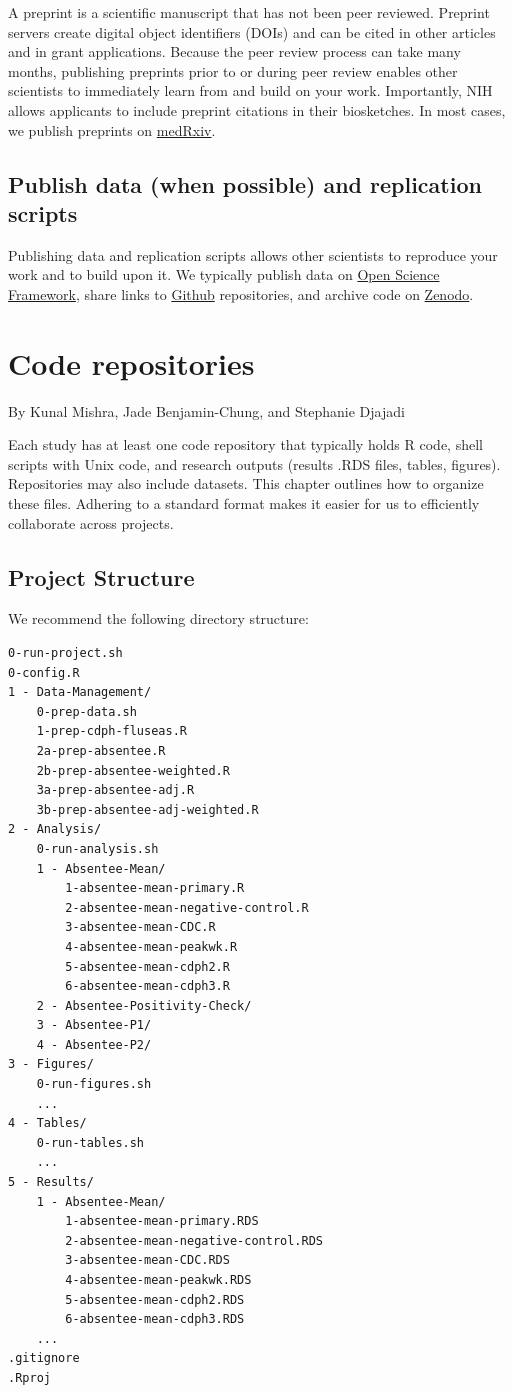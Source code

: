 \documentclass[
]{book}
\begin{document}
A preprint is a scientific manuscript that has not been peer reviewed. Preprint servers create digital object identifiers (DOIs) and can be cited in other articles and in grant applications. Because the peer review process can take many months, publishing preprints prior to or during peer review enables other scientists to immediately learn from and build on your work. Importantly, NIH allows applicants to include preprint citations in their biosketches. In most cases, we publish preprints on \href{https://www.medrxiv.org/}{medRxiv}.

\section{Publish data (when possible) and replication scripts}\label{publish-data-when-possible-and-replication-scripts}

Publishing data and replication scripts allows other scientists to reproduce your work and to build upon it. We typically publish data on \href{osf.io}{Open Science Framework}, share links to \href{github.com}{Github} repositories, and archive code on \href{zenodo.org}{Zenodo}.

\chapter{Code repositories}\label{code-repositories}

By Kunal Mishra, Jade Benjamin-Chung, and Stephanie Djajadi

Each study has at least one code repository that typically holds R code, shell scripts with Unix code, and research outputs (results .RDS files, tables, figures). Repositories may also include datasets. This chapter outlines how to organize these files. Adhering to a standard format makes it easier for us to efficiently collaborate across projects.

\section{Project Structure}\label{project-structure}

We recommend the following directory structure:

\begin{verbatim}
0-run-project.sh
0-config.R
1 - Data-Management/
    0-prep-data.sh
    1-prep-cdph-fluseas.R
    2a-prep-absentee.R
    2b-prep-absentee-weighted.R
    3a-prep-absentee-adj.R
    3b-prep-absentee-adj-weighted.R
2 - Analysis/
    0-run-analysis.sh
    1 - Absentee-Mean/
        1-absentee-mean-primary.R
        2-absentee-mean-negative-control.R
        3-absentee-mean-CDC.R
        4-absentee-mean-peakwk.R
        5-absentee-mean-cdph2.R
        6-absentee-mean-cdph3.R
    2 - Absentee-Positivity-Check/
    3 - Absentee-P1/
    4 - Absentee-P2/
3 - Figures/
    0-run-figures.sh
    ...
4 - Tables/
    0-run-tables.sh
    ...
5 - Results/
    1 - Absentee-Mean/
        1-absentee-mean-primary.RDS
        2-absentee-mean-negative-control.RDS
        3-absentee-mean-CDC.RDS
        4-absentee-mean-peakwk.RDS
        5-absentee-mean-cdph2.RDS
        6-absentee-mean-cdph3.RDS
    ...
.gitignore
.Rproj
\end{verbatim}
\end{document}

